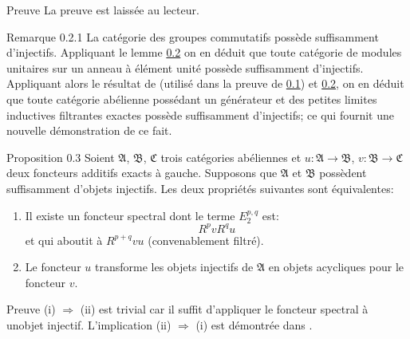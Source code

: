 \documentclass[10pt]{../fichiers-configuration-latex/smfart}
\begin{document}
\begin{enonce*}[remark]{Preuve}
La preuve est laissée au lecteur.
\end{enonce*}

\begin{enonce*}[remark]{Remarque 0.2.1}
La catégorie des groupes commutatifs possède suffisamment
d'injectifs. Appliquant le lemme \hyperref[V.prop0.2]{0.2} on en déduit que toute
catégorie de modules unitaires sur un anneau à élément unité
possède suffisamment d'injectifs. Appliquant alors le résultat de
\cite{SGA4-05:5} (utilisé dans la preuve de \hyperref[V.prop0.1]{0.1}) et \hyperref[V.prop0.2]{0.2}, on en déduit que toute
catégorie abélienne possédant un générateur et des petites
limites inductives filtrantes exactes possède suffisamment
d'injectifs; ce qui fournit une nouvelle démonstration de ce fait.
\end{enonce*}

\begin{enonce*}{Proposition 0.3}
Soient $\mathfrak{A}$, $\mathfrak{B}$, $\mathfrak{C}$ trois
catégories abéliennes et $u : \mathfrak{A} \rightarrow
\mathfrak{B}$, $v : \mathfrak{B} \rightarrow \mathfrak{C}$ deux
foncteurs additifs exacts à gauche. Supposons que $\mathfrak{A}$ et
$\mathfrak{B}$ possèdent suffisamment d'objets injectifs. Les deux
propriétés suivantes sont équivalentes:
\begin{enumerate}
\renewcommand{\theenumi}{\roman{enumi}}
\renewcommand{\labelenumi}{\theenumi)}
\item Il existe un foncteur spectral dont le terme $E^{p, q}_2$ est:
$$
R^p vR^qu
$$
et qui aboutit à $R^{p+q} vu$ (convenablement filtré).
\item Le foncteur $u$ transforme les objets injectifs de
  $\mathfrak{A}$ en objets acycliques pour le foncteur $v$.
\end{enumerate}
\end{enonce*}

\begin{enonce*}[remark]{Preuve}
(i) $\Rightarrow$ (ii) est trivial car il suffit d'appliquer le foncteur
  spectral à un\pageoriginale objet injectif. L'implication (ii) $\Rightarrow$ (i)
  est démontrée dans \cite{SGA4-05:11}.
\end{enonce*}
\end{document}
